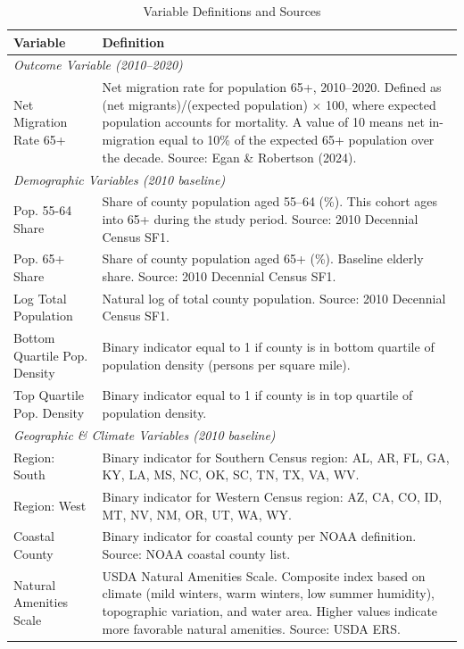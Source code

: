 \begin{table}[htbp!]
\centering
\caption{Variable Definitions and Sources}
\label{tab:variable_definitions}
\small
\begin{tabular}{p{3.5cm}p{12cm}}
\hline\hline
Variable & Definition \\
\hline
\multicolumn{2}{l}{\textit{Outcome Variable (2010--2020)}} \\
Net Migration Rate 65+ & Net migration rate for population 65+, 2010--2020. Defined as (net migrants)/(expected population) $\times$ 100, where expected population accounts for mortality. A value of 10 means net in-migration equal to 10\% of the expected 65+ population over the decade. Source: Egan \& Robertson (2024). \\
[3pt]
\hline
\multicolumn{2}{l}{\textit{Demographic Variables (2010 baseline)}} \\
Pop. 55-64 Share & Share of county population aged 55--64 (\%). This cohort ages into 65+ during the study period. Source: 2010 Decennial Census SF1. \\
[3pt]
Pop. 65+ Share & Share of county population aged 65+ (\%). Baseline elderly share. Source: 2010 Decennial Census SF1. \\
[3pt]
Log Total Population & Natural log of total county population. Source: 2010 Decennial Census SF1. \\
[3pt]
Bottom Quartile Pop. Density & Binary indicator equal to 1 if county is in bottom quartile of population density (persons per square mile). \\
[3pt]
Top Quartile Pop. Density & Binary indicator equal to 1 if county is in top quartile of population density. \\
[3pt]
\hline
\multicolumn{2}{l}{\textit{Geographic \& Climate Variables (2010 baseline)}} \\
Region: South & Binary indicator for Southern Census region: AL, AR, FL, GA, KY, LA, MS, NC, OK, SC, TN, TX, VA, WV. \\
[3pt]
Region: West & Binary indicator for Western Census region: AZ, CA, CO, ID, MT, NV, NM, OR, UT, WA, WY. \\
[3pt]
Coastal County & Binary indicator for coastal county per NOAA definition. Source: NOAA coastal county list. \\
[3pt]
Natural Amenities Scale & USDA Natural Amenities Scale. Composite index based on climate (mild winters, warm winters, low summer humidity), topographic variation, and water area. Higher values indicate more favorable natural amenities. Source: USDA ERS. \\

\end{tabular}
\end{table}
